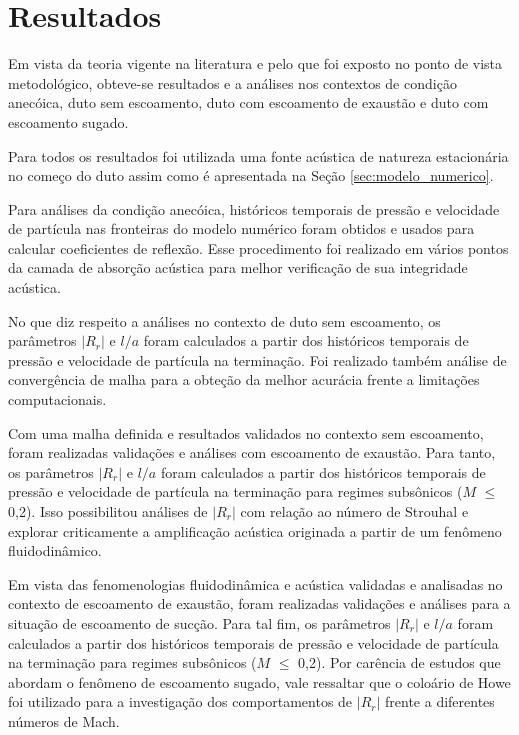 \chapter{Resultados}

Em vista da teoria vigente na literatura e pelo que foi exposto no ponto de vista metodológico, 
obteve-se resultados e a análises nos contextos de condição anecóica, duto sem escoamento, 
duto com escoamento de exaustão e duto com escoamento sugado.

Para todos os resultados foi utilizada uma fonte acústica de 
natureza estacionária no começo do duto 
assim como é apresentada na Seção \ref{sec:modelo_numerico}.

Para análises da condição anecóica, históricos temporais de pressão e 
velocidade de partícula nas fronteiras do modelo numérico foram 
obtidos e usados para calcular coeficientes de reflexão. 
Esse procedimento foi realizado em vários pontos da camada de 
absorção acústica para melhor verificação de sua integridade acústica.

No que diz respeito a análises no contexto de duto sem escoamento,
 os parâmetros $|R_{r}|$ e $l/a$ foram calculados a partir dos 
históricos temporais de pressão e velocidade de partícula na terminação.
 Foi realizado também análise de convergência de malha para a obteção 
 da melhor acurácia frente a limitações computacionais.

Com uma malha definida e resultados validados no contexto 
sem escoamento, foram realizadas validações e análises 
com escoamento de exaustão. 
Para tanto, os parâmetros $|R_{r}|$ e $l/a$ foram calculados
 a partir dos históricos temporais de pressão e velocidade 
 de partícula na terminação para regimes subsônicos ($M$ $\leq$ 0,2).
  Isso possibilitou análises de $|R_{r}|$ com relação ao número de 
  Strouhal e explorar criticamente a amplificação acústica originada a 
  partir de um fenômeno fluidodinâmico. 

Em vista das fenomenologias fluidodinâmica e acústica validadas
 e analisadas no contexto de escoamento de exaustão,
  foram realizadas validações e análises para 
  a situação de escoamento de sucção. 
  Para tal fim, os parâmetros $|R_{r}|$ e $l/a$ foram 
  calculados a partir dos históricos temporais de 
  pressão e velocidade de partícula na terminação para 
  regimes subsônicos ($M$ $\leq$ 0,2). 
  Por carência de estudos que abordam o fenômeno de 
  escoamento sugado, vale ressaltar que o coloário de 
  Howe foi utilizado para a investigação dos 
  comportamentos de $|R_{r}|$ frente a diferentes números de Mach.

